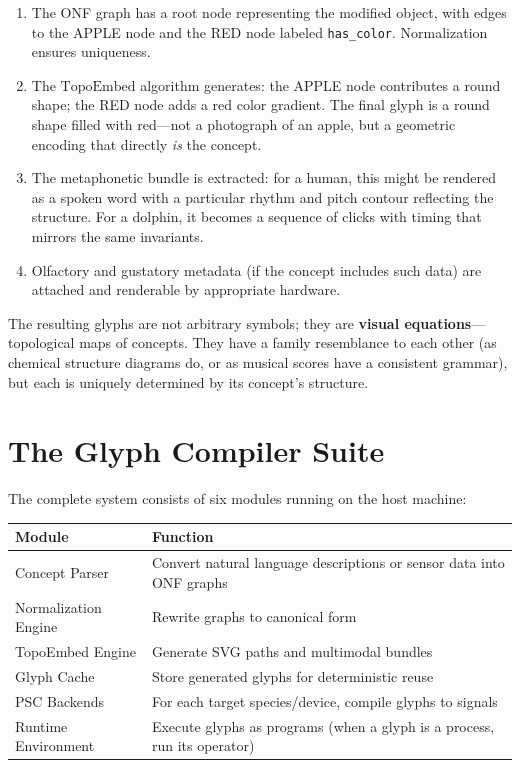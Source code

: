 \documentclass[12pt, letterpaper]{book}
\begin{document}
\begin{enumerate}[label=\textbf{Step \arabic*:}]
    \item The ONF graph has a root node representing the modified object, with edges to the APPLE node and the RED node labeled \texttt{has\_color}. Normalization ensures uniqueness.
    \item The $\mathrm{TopoEmbed}$ algorithm generates: the APPLE node contributes a round shape; the RED node adds a red color gradient. The final glyph is a round shape filled with red---not a photograph of an apple, but a geometric encoding that directly \textit{is} the concept.
    \item The metaphonetic bundle is extracted: for a human, this might be rendered as a spoken word with a particular rhythm and pitch contour reflecting the structure. For a dolphin, it becomes a sequence of clicks with timing that mirrors the same invariants.
    \item Olfactory and gustatory metadata (if the concept includes such data) are attached and renderable by appropriate hardware.
\end{enumerate}

The resulting glyphs are not arbitrary symbols; they are \textbf{visual equations}---topological maps of concepts. They have a family resemblance to each other (as chemical structure diagrams do, or as musical scores have a consistent grammar), but each is uniquely determined by its concept's structure.

\section{The Glyph Compiler Suite}

The complete system consists of six modules running on the host machine:

\begin{center}
\begin{tabular}{lp{8cm}}
\toprule
\textbf{Module} & \textbf{Function} \\
\midrule
Concept Parser & Convert natural language descriptions or sensor data into ONF graphs \\
Normalization Engine & Rewrite graphs to canonical form \\
TopoEmbed Engine & Generate SVG paths and multimodal bundles \\
Glyph Cache & Store generated glyphs for deterministic reuse \\
PSC Backends & For each target species/device, compile glyphs to signals \\
Runtime Environment & Execute glyphs as programs (when a glyph is a process, run its operator) \\
\bottomrule
\end{tabular}
\end{center}
\end{document}

